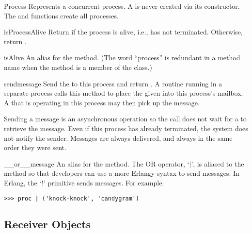 \documentclass{howto}
\newcommand{\pipe}[0]{\begin{math}|\end{math}}
\newcommand{\pipe}[0]{|}
\begin{document}
\begin{classdesc}{Process}{}
Represents a concurrent process. A  is never created via its
constructor. The  and  functions create
all processes.

\begin{methoddesc}{isProcessAlive}{}
Return  if the process is alive, i.e., has not terminated.
Otherwise, return .
\end{methoddesc}

\begin{methoddesc}{isAlive}{}
An alias for the  method. (The word ``process'' is
redundant in a method name when the method is a member of the 
class.)
\end{methoddesc}

\begin{methoddesc}{send}{message}
Send the  to this process and return . A routine
running in a separate process calls this method to place the given
 into this process's mailbox. A  that is operating
in this process may then pick up the message.

Sending a message is an asynchronous operation so the  call does
not wait for a  to retrieve the message. Even if this process
has already terminated, the system does not notify the sender. Messages are
always delivered, and always in the same order they were sent.
\end{methoddesc}

\begin{methoddesc}{__or__}{message}
\opindex{|}
An alias for the  method. The OR operator, `\pipe', is aliased to
the  method so that developers can use a more Erlangy syntax to
send messages. In Erlang, the `!' primitive sends messages. For example:
\begin{verbatim}
>>> proc | ('knock-knock', 'candygram')
\end{verbatim}
\end{methoddesc}

\end{classdesc}



\subsection{Receiver Objects}
\label{Receiver}
\end{document}
